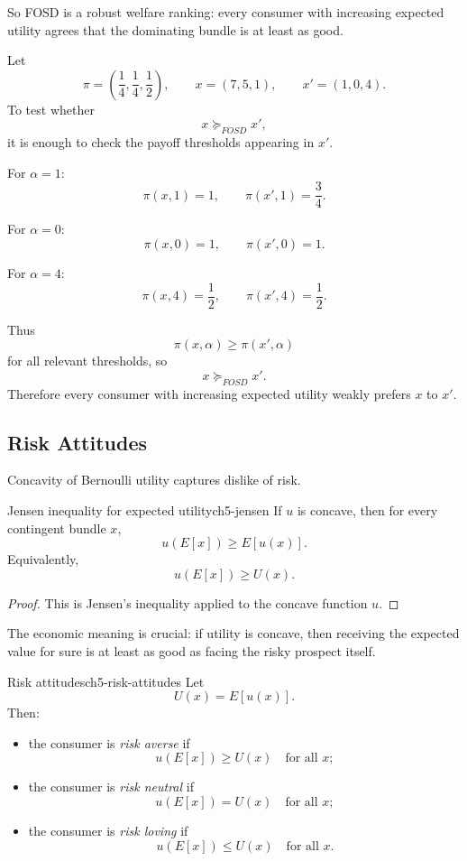 So FOSD is a robust welfare ranking: every consumer with increasing expected utility agrees that the dominating bundle is at least as good.

\begin{examplebox}[title={Worked Example: checking first-order stochastic dominance}]
Let
\[
\pi=\left(\frac14,\frac14,\frac12\right),
\qquad
x=(7,5,1),
\qquad
x'=(1,0,4).
\]
To test whether
\[
x \succeq_{FOSD} x',
\]
it is enough to check the payoff thresholds appearing in $x'$.

For $\alpha=1$:
\[
\pi(x,1)=1,
\qquad
\pi(x',1)=\frac34.
\]

For $\alpha=0$:
\[
\pi(x,0)=1,
\qquad
\pi(x',0)=1.
\]

For $\alpha=4$:
\[
\pi(x,4)=\frac12,
\qquad
\pi(x',4)=\frac12.
\]

Thus
\[
\pi(x,\alpha)\ge \pi(x',\alpha)
\]
for all relevant thresholds, so
\[
\boxed{x \succeq_{FOSD} x'.}
\]
Therefore every consumer with increasing expected utility weakly prefers $x$ to $x'$.
\end{examplebox}

\subsection{Risk Attitudes}

Concavity of Bernoulli utility captures dislike of risk.

\begin{theorem}{Jensen inequality for expected utility}{ch5-jensen}
If $u$ is concave, then for every contingent bundle $x$,
\[
u(E[x]) \ge E[u(x)].
\]
Equivalently,
\[
u(E[x]) \ge U(x).
\]
\end{theorem}

\begin{proof}
This is Jensen's inequality applied to the concave function $u$.
\end{proof}

The economic meaning is crucial: if utility is concave, then receiving the expected value for sure is at least as good as facing the risky prospect itself.

\begin{definition}{Risk attitudes}{ch5-risk-attitudes}
Let
\[
U(x)=E[u(x)].
\]
Then:
\begin{itemize}
    \item the consumer is \emph{risk averse} if
    \[
    u(E[x]) \ge U(x)
    \quad \text{for all } x;
    \]
    \item the consumer is \emph{risk neutral} if
    \[
    u(E[x]) = U(x)
    \quad \text{for all } x;
    \]
    \item the consumer is \emph{risk loving} if
    \[
    u(E[x]) \le U(x)
    \quad \text{for all } x.
    \]
\end{itemize}
\end{definition}

